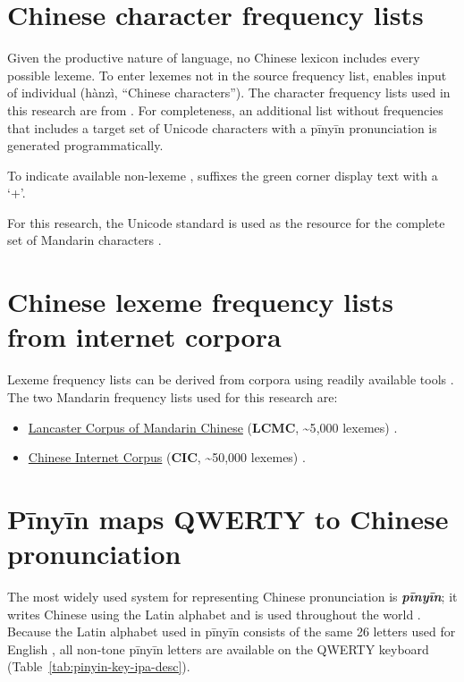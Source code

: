 \section{Chinese character frequency lists}\label{sec:chinese-character-frequency-lists}

Given the productive nature of language, no Chinese lexicon includes every possible lexeme.
To enter lexemes not in the source frequency list, \muciyu enables input of individual \hanzi
(hànzì, ``Chinese characters''). The character frequency lists used in this research are from
\cite{Da2004ChineseCharBigramFrequencies}. For completeness, an additional list without frequencies that
includes a target set of Unicode characters with a pīnyīn pronunciation is generated programmatically.

To indicate available non-lexeme \hanzi, \muciyu suffixes the green corner display text with a `+'.

For this research, the Unicode standard is used as the resource for the complete set of Mandarin characters
\parencite{UnicodeConsortium2025Unicode170}.

\section{Chinese lexeme frequency lists from internet corpora}\label{sec:chinese-lexeme-frequency-lists}

Lexeme frequency lists can be derived from corpora using readily available tools
\parencite{BaroniKilgarriff2006LargeWebCorpora}. The two Mandarin frequency lists used for this research are:
\begin{itemize}
	\item \href{http://corpus.leeds.ac.uk/frqc/lcmc.num}{Lancaster Corpus of Mandarin Chinese} (\textbf{LCMC},
	\textasciitilde5{,}000 lexemes) \parencite{McEneryXiao2004LCMC}.
	\item \href{http://corpus.leeds.ac.uk/frqc/internet-zh.num}{Chinese Internet Corpus} (\textbf{CIC},
	\textasciitilde50{,}000 lexemes) \parencite{Sharoff2006AutomatedSearchEngineCorpora}.
\end{itemize}


\section{Pīnyīn maps QWERTY to Chinese pronunciation}\label{sec:pinyin-maps-qwerty}

The most widely used system for representing Chinese pronunciation is \textbf{\emph{pīnyīn}}; it writes Chinese using the Latin alphabet and is used throughout the world \parencite{LoC1997PinyinPressRelease}. Because the Latin alphabet used in pīnyīn consists of the same 26 letters used for English \parencite{CIA2007ProgressOfPinyin}, all non-tone pīnyīn letters are available on the QWERTY keyboard (Table~\ref{tab:pinyin-key-ipa-desc}).

